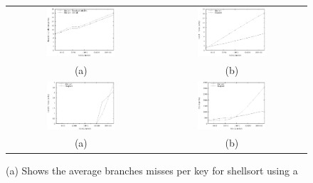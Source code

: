 \documentclass[acmtocl]{acmtrans2m}
\begin{document}
\begin{figure}
\centering
\begin{tabular}{cc}
\includegraphics[width=0.48\textwidth]{plots/shellsort_branch_misses.eps} & \includegraphics[width=0.48\textwidth]{plots/shell_heap_cache_misses.eps} \\
(a) & (b) \\
\includegraphics[width=0.48\textwidth]{plots/shell_heap_L2_misses.eps} & \includegraphics[width=0.48\textwidth]{plots/shell_heap_cycles.eps} \\
(a) & (b) \\
\end{tabular}
\caption{(a) Shows the average branches misses per key for shellsort using a
}
\end{figure}
\end{document}
